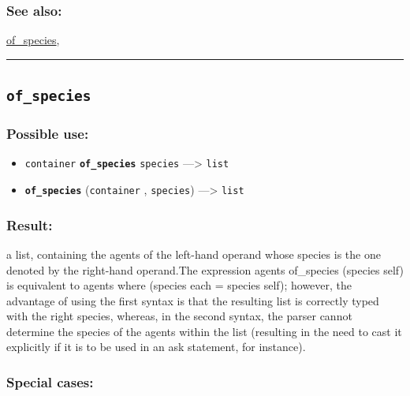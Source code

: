 \documentclass[]{book}
\providecommand{\tightlist}{%
  \setlength{\itemsep}{0pt}\setlength{\parskip}{0pt}}
\theoremstyle{definition}
\theoremstyle{definition}
\theoremstyle{definition}
\theoremstyle{remark}
\begin{document}
\subsubsection{See also:}\label{see-also-149}

\href{operators-n-to-r.html\#of_species}{of\_species},

\begin{center}\rule{0.5\linewidth}{\linethickness}\end{center}

\subsection{\texorpdfstring{\texttt{of\_species}}{of\_species}}\label{of_species}

\subsubsection{Possible use:}\label{possible-use-382}

\begin{itemize}
\tightlist
\item
  \texttt{container} \textbf{\texttt{of\_species}} \texttt{species}
  ---\textgreater{} \texttt{list}
\item
  \textbf{\texttt{of\_species}} (\texttt{container} , \texttt{species})
  ---\textgreater{} \texttt{list}
\end{itemize}

\subsubsection{Result:}\label{result-368}

a list, containing the agents of the left-hand operand whose species is
the one denoted by the right-hand operand.The expression agents
of\_species (species self) is equivalent to agents where (species each =
species self); however, the advantage of using the first syntax is that
the resulting list is correctly typed with the right species, whereas,
in the second syntax, the parser cannot determine the species of the
agents within the list (resulting in the need to cast it explicitly if
it is to be used in an ask statement, for instance).

\subsubsection{Special cases:}\label{special-cases-105}
\end{document}
